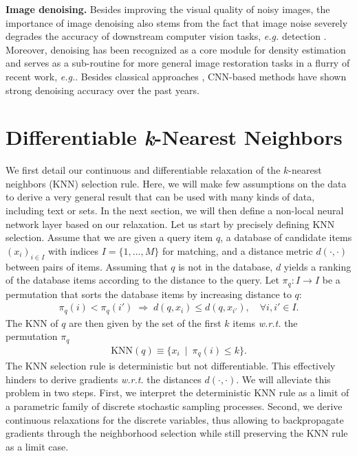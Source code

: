 \documentclass{article}
\makeatletter
\newcommand{\eg}{\emph{e.\thinspace{}g.}\@\xspace}
\newcommand{\wrt}{\emph{w.\thinspace{}r.\thinspace{}t.}\@\xspace}
\newcommand{\myparagraph}[1]{\smallskip\noindent\textbf{#1}}
\newcommand\dist{d}
\newcommand\KNN{\text{KNN}}
\newcommand\q{q}
\newcommand\kk{k}
\newcommand\db{x}
\newcommand\dbI{I}
\newcommand\perm{\pi}
\newcommand\given{\ | \ }
\makeatother
\begin{document}
\myparagraph{Image denoising.}
Besides improving the visual quality of noisy images, the importance of image denoising also stems from the fact that image noise severely degrades the accuracy of downstream computer vision tasks, \eg detection \cite{Diamond:2017:DPO}. 
Moreover, denoising has been recognized as a core module for density estimation \cite{Alain:2014:WRA} and serves as a sub-routine for more general image restoration tasks in a flurry of recent work, \eg \cite{Bigdeli:2017:DMS,Romano:2017:TLE,Zhang:2017:LDC}. 
Besides classical approaches \cite{Donoho:1995:DST,Roth:2009:FEF}, CNN-based methods \cite{Jain:2009:NID,Mao:2016:IRU,Zhang:2017:BGD} have shown strong denoising accuracy over the past years.
 

\section{Differentiable \emph{k}-Nearest Neighbors}
\label{sec:matching}
We first detail our continuous and differentiable relaxation of the
$\kk$-nearest neighbors (KNN) selection rule.
Here, we will make few assumptions on the data to derive a very general result that can be used with many kinds of data, including text or sets.
In the next section, we will then define a non-local neural network layer based on our relaxation.
Let us start by precisely defining KNN selection. 
Assume that we are given a query item $\q$, a database of candidate
items $(\db_i)_{i \in \dbI}$ with indices $\dbI=\{1,\ldots,M\}$ for matching, and a distance metric $\dist(\cdot, \cdot)$ between pairs of items. 
Assuming that $\q$ is not in the database, $\dist$ yields a ranking of the database items
according to the distance to the query. 
Let $\perm_{\q}: \dbI \rightarrow \dbI$ be a permutation 
that sorts the database items by
increasing distance to $\q$:
\begin{align}
\perm_{\q}(i) < \perm_{\q}(i') \;\Rightarrow\; \dist(\q, \db_i) \leq \dist(\q,\db_{i'}), \quad\forall i,i' \in \dbI.
\end{align}
The KNN of $\q$ are then given by the set of the first $\kk$ items \wrt the permutation $\perm_{\q}$
\begin{align}
\KNN(\q) \equiv \{\db_i \; \given \; \perm_{\q}(i) \leq \kk \}. \label{eq:knn}
\end{align}
The KNN selection rule is deterministic but not differentiable. 
This effectively hinders to derive gradients \wrt the distances $\dist(\cdot,\cdot)$. 
We will alleviate this problem in two steps. 
First, we interpret the deterministic KNN rule as a limit of a parametric family of discrete stochastic sampling
processes. 
Second, we derive continuous relaxations for the discrete variables, 
thus allowing to
backpropagate gradients through the neighborhood selection while still preserving
the KNN rule as a limit case.
\end{document}
